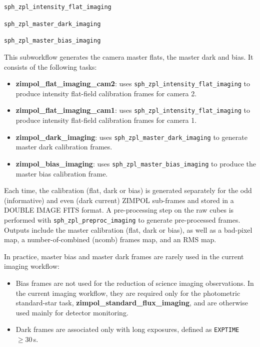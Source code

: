 \texttt{sph\_zpl\_intensity\_flat\_imaging} 

\texttt{sph\_zpl\_master\_dark\_imaging} 

\texttt{sph\_zpl\_master\_bias\_imaging}

This subworkflow generates the camera master flats, the master dark and bias. It consists of the following tasks:

\begin{itemize}
\item \textbf{zimpol\_flat\_imaging\_cam2}: uses \texttt{sph\_zpl\_intensity\_flat\_imaging} to produce intensity flat-field calibration frames for camera 2.
\item \textbf{zimpol\_flat\_imaging\_cam1}: uses \texttt{sph\_zpl\_intensity\_flat\_imaging} to produce intensity flat-field calibration frames for camera 1.
\item \textbf{zimpol\_dark\_imaging}: uses \texttt{sph\_zpl\_master\_dark\_imaging} to generate master dark calibration frames.
\item \textbf{zimpol\_bias\_imaging}: uses \texttt{sph\_zpl\_master\_bias\_imaging} to produce the master bias calibration frame.
\end{itemize}

Each time, the calibration (flat, dark or bias) is generated separately for the odd (informative) and even (dark current)
ZIMPOL sub-frames and stored in a DOUBLE IMAGE FITS format.
A pre-processing step on the raw cubes is performed with \texttt{sph\_zpl\_preproc\_imaging} to generate pre-processed frames.
Outputs include the master calibration (flat, dark or bias),
as well as a bad-pixel map, a number-of-combined (ncomb) frames map, and an RMS map.

In practice, master bias and master dark frames are rarely used in the current imaging workflow:

\begin{itemize}
\item Bias frames are not used for the reduction of science imaging observations.
In the current imaging workflow, they are required only for the photometric
standard-star task, \textbf{zimpol\_standard\_flux\_imaging}, and are otherwise
used mainly for detector monitoring.
\item Dark frames are associated only with long exposures, defined as
\texttt{EXPTIME} $\geq 30$\,s.
\end{itemize}

